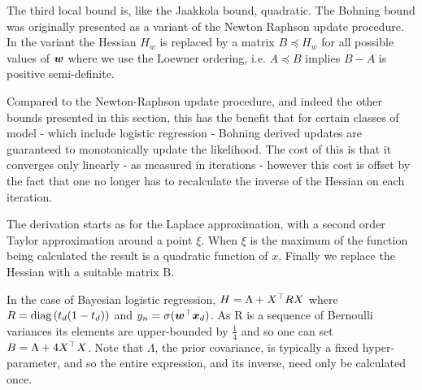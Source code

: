 The third local bound is, like the Jaakkola bound, quadratic. The Bohning bound  was originally presented \cite{Bohning1988a} as a variant of the Newton Raphson update procedure. In the variant the Hessian $H_w$ is replaced by a matrix $B \preceq H_w$ for all possible values of $\bm w$ where we use the Loewner ordering, i.e. $A \preceq B$ implies $B - A$ is positive semi-definite.

Compared to the Newton-Raphson update procedure, and indeed the other bounds presented in this section, this has the benefit that for certain classes of model - which include logistic regression - Bohning derived updates are guaranteed to monotonically update the likelihood. The cost of this is that it converges only linearly - as measured in iterations - however this cost is offset by the fact that one no longer has to recalculate the inverse of the Hessian on each iteration.

The derivation starts as for the Laplace approximation, with a second order Taylor approximation around a point $\xi$. When $\xi$ is the maximum of the function being calculated the result is a quadratic function of $x$. Finally we replace the Hessian with a suitable matrix B.

%

In the case of Bayesian logistic regression, $H = \Lambda + X^\top R X$ where $R = \text{diag} \left( {t_d (1-t_d)} \right)$ and $y_n = \sigma(\bm w^\top\bm x_d)$. As R is a sequence of Bernoulli variances its elements are upper-bounded by $\frac{1}{4}$ and so one can set $B = \Lambda + 4 X^\top X$. Note that $\Lambda$, the prior covariance, is typically a fixed hyper-parameter, and so the entire expression, and its inverse, need only be calculated once.


